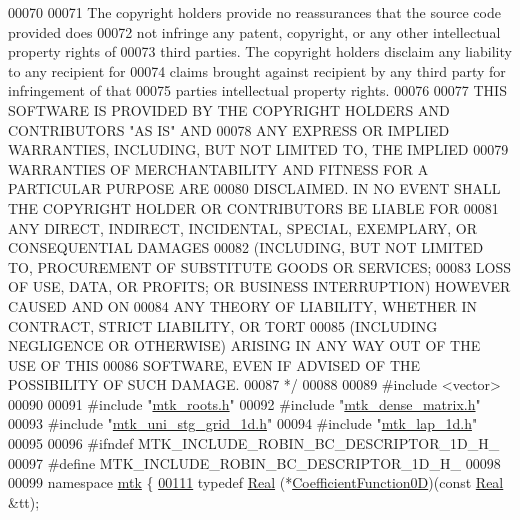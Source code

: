 \begin{DoxyCode}
00070 \textcolor{comment}{}
00071 \textcolor{comment}{The copyright holders provide no reassurances that the source code provided does}
00072 \textcolor{comment}{not infringe any patent, copyright, or any other intellectual property rights of}
00073 \textcolor{comment}{third parties. The copyright holders disclaim any liability to any recipient for}
00074 \textcolor{comment}{claims brought against recipient by any third party for infringement of that}
00075 \textcolor{comment}{parties intellectual property rights.}
00076 \textcolor{comment}{}
00077 \textcolor{comment}{THIS SOFTWARE IS PROVIDED BY THE COPYRIGHT HOLDERS AND CONTRIBUTORS "AS IS" AND}
00078 \textcolor{comment}{ANY EXPRESS OR IMPLIED WARRANTIES, INCLUDING, BUT NOT LIMITED TO, THE IMPLIED}
00079 \textcolor{comment}{WARRANTIES OF MERCHANTABILITY AND FITNESS FOR A PARTICULAR PURPOSE ARE}
00080 \textcolor{comment}{DISCLAIMED. IN NO EVENT SHALL THE COPYRIGHT HOLDER OR CONTRIBUTORS BE LIABLE FOR}
00081 \textcolor{comment}{ANY DIRECT, INDIRECT, INCIDENTAL, SPECIAL, EXEMPLARY, OR CONSEQUENTIAL DAMAGES}
00082 \textcolor{comment}{(INCLUDING, BUT NOT LIMITED TO, PROCUREMENT OF SUBSTITUTE GOODS OR SERVICES;}
00083 \textcolor{comment}{LOSS OF USE, DATA, OR PROFITS; OR BUSINESS INTERRUPTION) HOWEVER CAUSED AND ON}
00084 \textcolor{comment}{ANY THEORY OF LIABILITY, WHETHER IN CONTRACT, STRICT LIABILITY, OR TORT}
00085 \textcolor{comment}{(INCLUDING NEGLIGENCE OR OTHERWISE) ARISING IN ANY WAY OUT OF THE USE OF THIS}
00086 \textcolor{comment}{SOFTWARE, EVEN IF ADVISED OF THE POSSIBILITY OF SUCH DAMAGE.}
00087 \textcolor{comment}{*/}
00088 
00089 \textcolor{preprocessor}{#include <vector>}
00090 
00091 \textcolor{preprocessor}{#include "\hyperlink{mtk__roots_8h}{mtk\_roots.h}"}
00092 \textcolor{preprocessor}{#include "\hyperlink{mtk__dense__matrix_8h}{mtk\_dense\_matrix.h}"}
00093 \textcolor{preprocessor}{#include "\hyperlink{mtk__uni__stg__grid__1d_8h}{mtk\_uni\_stg\_grid\_1d.h}"}
00094 \textcolor{preprocessor}{#include "\hyperlink{mtk__lap__1d_8h}{mtk\_lap\_1d.h}"}
00095 
00096 \textcolor{preprocessor}{#ifndef MTK\_INCLUDE\_ROBIN\_BC\_DESCRIPTOR\_1D\_H\_}
00097 \textcolor{preprocessor}{#define MTK\_INCLUDE\_ROBIN\_BC\_DESCRIPTOR\_1D\_H\_}
00098 
00099 \textcolor{keyword}{namespace }\hyperlink{namespacemtk}{mtk} \{
\hypertarget{mtk__robin__bc__descriptor__1d_8h_source_l00111}{}\hyperlink{group__c07-mim__ops_ga04276745b4d511f0f3c636d6e0df7c2d}{00111} \textcolor{keyword}{typedef} \hyperlink{group__c01-roots_gac080bbbf5cbb5502c9f00405f894857d}{Real} (*\hyperlink{group__c07-mim__ops_ga04276745b4d511f0f3c636d6e0df7c2d}{CoefficientFunction0D})(\textcolor{keyword}{const} \hyperlink{group__c01-roots_gac080bbbf5cbb5502c9f00405f894857d}{Real} &tt);

\end{DoxyCode}
